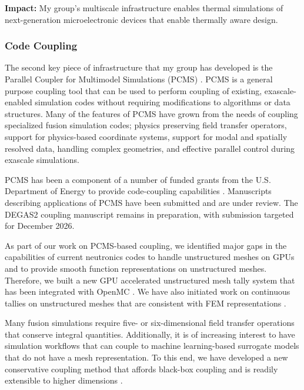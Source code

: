 \textbf{Impact:} My group's multiscale infrastructure enables thermal simulations of next-generation microelectronic devices that enable thermally aware design.

\subsubsection{Code Coupling}
The second key piece of infrastructure that my group has developed is the Parallel Coupler for Multimodel Simulations (PCMS) \cite{mersonPCMS2025}. PCMS is a general purpose coupling tool that can be used to perform coupling of existing, exascale-enabled simulation codes without requiring modifications to algorithms or data structures. Many of the features of PCMS have grown from the needs of coupling specialized fusion simulation codes; physics preserving field transfer operators, support for physics-based coordinate systems, support for modal and spatially resolved data, handling complex geometries, and effective parallel control during exascale simulations.

PCMS has been a component of a number of funded grants from the U.S. Department of Energy to provide code-coupling capabilities \cite{HiFiStell, StellFoundry, CEDA,SimmetrixSBIR2024,OASIS,SimmetrixSBIR2023,OASIS2}. Manuscripts describing applications of PCMS have been submitted and are under review. The DEGAS2 coupling manuscript remains in preparation, with submission targeted for December 2026.

As part of our work on PCMS-based coupling, we identified major gaps in the capabilities of current neutronics codes to handle unstructured meshes on GPUs and to provide smooth function representations on unstructured meshes. Therefore, we built a new GPU accelerated unstructured mesh tally system that has been integrated with OpenMC \cite{hasanGPUAccelerationMonte2025}. We have also initiated work on continuous tallies on unstructured meshes that are consistent with FEM representations \cite{mersonSpatiallyContinuousTally2026}.

Many fusion simulations require five- or six-dimensional field transfer operations that conserve integral quantities. Additionally, it is of increasing interest to have simulation workflows that can couple to machine learning-based surrogate models that do not have a mesh representation. To this end, we have developed a new conservative coupling method that affords black-box coupling and is readily extensible to higher dimensions \cite{Paudel2026MCFT}.

